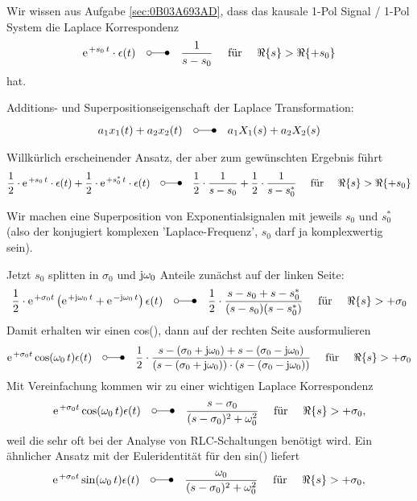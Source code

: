 \documentclass[11pt,a4paper,DIV=12]{scrartcl}
\numberwithin{equation}{section}
\numberwithin{figure}{section}
\begin{document}
\begin{Werkzeug}
Wir wissen aus Aufgabe \ref{sec:0B03A693AD}, dass das kausale 1-Pol Signal / 1-Pol System
die Laplace Korrespondenz
\begin{align}
\e^{+s_0 \, t} \cdot \epsilon(t) \quad \laplace \quad \frac{1}{s-s_0} \quad\text{ für } \quad\Re\{s\} > \Re\{+s_0\}\\
\end{align}
hat.

Additions- und Superpositionseigenschaft der Laplace Transformation:
\begin{align}
a_1 x_1(t) + a_2 x_2(t) \quad\laplace\quad  a_1 X_1(s) + a_2 X_2(s)
\end{align}
\end{Werkzeug}
\begin{Ansatz}
Willkürlich erscheinender Ansatz, der aber zum gewünschten Ergebnis führt
\begin{align}
\frac{1}{2}\cdot\e^{+s_0 \, t}\cdot \epsilon(t)+
\frac{1}{2}\cdot\e^{+s_0^* \, t}\cdot \epsilon(t)
\quad \laplace \quad
\frac{1}{2}\cdot\frac{1}{s-s_0} + \frac{1}{2}\cdot\frac{1}{s-s_0^*}
\quad\text{ für } \quad\Re\{s\} > \Re\{+s_0\}
\end{align}
\end{Ansatz}
\begin{ExCalc}
Wir machen eine Superposition von Exponentialsignalen mit jeweils $s_0$ und
$s_0^*$ (also der konjugiert komplexen 'Laplace-Frequenz',
$s_0$ darf ja komplexwertig sein).

Jetzt $s_0$ splitten in $\sigma_0$ und $\im\omega_0$ Anteile zunächst auf der linken
Seite:
\begin{align}
\frac{1}{2}\cdot\e^{+\sigma_0 t}
\left(
\e^{+\im\omega_0 \, t}+
\e^{-\im\omega_0 \, t}
\right) \epsilon(t)
\quad \laplace \quad
\frac{1}{2}\cdot\frac{s-s_0 + s-s_0^*}{(s-s_0)(s-s_0^*)}
\quad\text{ für } \quad\Re\{s\} > +\sigma_0
\end{align}
Damit erhalten wir einen cos(), dann auf der rechten Seite ausformulieren
\begin{align}
\e^{+\sigma_0 t} \cos(\omega_0 \, t) \epsilon(t)
\quad \laplace \quad
\frac{1}{2}\cdot\frac{s-(\sigma_0+\im\omega_0) + s-(\sigma_0-\im\omega_0)}
{(s-(\sigma_0+\im\omega_0)) \cdot (s-(\sigma_0-\im\omega_0))}
\quad\text{ für } \quad\Re\{s\} > +\sigma_0
\end{align}
Mit Vereinfachung kommen wir zu einer wichtigen Laplace Korrespondenz
\begin{align}
\e^{+\sigma_0 t} \cos(\omega_0 \, t) \epsilon(t)
\quad \laplace \quad
\frac{s-\sigma_0}{(s-\sigma_0)^2+\omega_0^2}
\quad\text{ für } \quad\Re\{s\} >  +\sigma_0,
\end{align}
weil die sehr oft bei der Analyse von RLC-Schaltungen benötigt wird.
%
Ein ähnlicher Ansatz mit der Euleridentität für den sin() liefert
\begin{align}
\e^{+\sigma_0 t} \sin(\omega_0 \, t) \epsilon(t)
\quad \laplace \quad
\frac{\omega_0}{(s-\sigma_0)^2+\omega_0^2}
\quad\text{ für } \quad\Re\{s\} >  +\sigma_0,
\end{align}

\end{ExCalc}
\end{document}
